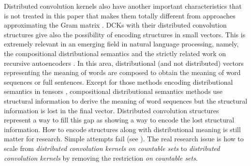 \documentclass[twoside,11pt]{article}
\def\comment#1#2{}
\begin{document}
\comment{[R2,C5][IssueC]}{Introduction: the position of the paper is extremely narrow, and the authors only connect to other work 
on tree kernels. It is thus likely to be ignored by many reader interested in ML for NLP. I believe this 
paper is part of a trend: using recursive structures to handle problems when one needs a proper 
representation for long term dependencies. The most vocal representative of this new trend is Richard 
Socher. It would also have been interesting to compare DTK to Recursive NN on some problems that are 
much more recent and critical that ones used for experiments in this paper, such as sentiment analysis.}
Distributed convolution kernels also have another important characteristics that is not treated in this paper that makes them totally different from approaches approximating the Gram matrix \cite{DBLP:conf/nips/WilliamsS00,Fine:2002:EST:944790.944812,Bach:2003:KIC:944919.944920}. DCKs with their distributed convolution structures give also the possibility of encoding structures in small vectors. This is extremely relevant in an emerging field in natural language processing, namely, the compositional distributional semantics \cite{mitchell-lapata:2008:ACLMain,baroni-zamparelli:2010:EMNLP,fabio2010-2} and the strictly related work on recursive autoencoders \cite{SocherEtAl2011:PoolRAE,SocherEtAl2012:MVRNN}. In this area, distributional (and not distributed) vectors representing the meaning of words are composed to obtain the meaning of word sequences or full sentences. Except for those methods encoding distributional semantics in tensors \cite{ClarkCoeckeSadrzadeh2008,Grefenstette:2011:ESC:2145432.2145580},
 compositional distributional semantics methods use structural information to derive the meaning of word sequences but the structural information is lost in the final vector. Distributed convolution structures represent a way to fill this gap as showing a way to encode the lost structural information. How to encode structures along with distributional meaning is still matter for research. Simple attempts fail (see \cite{zanzotto-dellarciprete:2011:DiSCo}). The real research issue is how to scale from \emph{distributed convolution kernels on countable sets} to \emph{distributed convolution kernels} by removing the restriction \emph{on countable sets}. 
\end{document}
